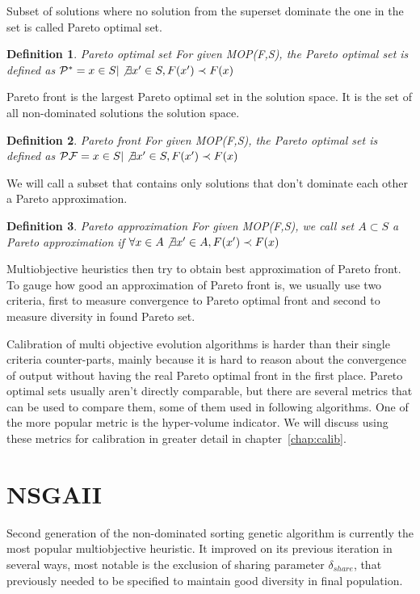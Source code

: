\documentclass[12pt,oneside]{fithesis2}
\newtheorem{defn}{Definition}
\begin{document}
Subset of solutions where no solution from the superset dominate the one in the set is called Pareto optimal set.

\begin{defn}{Pareto optimal set}
  For given MOP(F,S), the Pareto optimal set is defined as ${\cal{
P}^*} = {x \in S | \not \exists x' \in S, F(x') \prec F(x)}$
\end{defn}

Pareto front is the largest Pareto optimal set in the solution space. It is the set of all non-dominated solutions the solution space. 

\begin{defn}{Pareto front}
  For given MOP(F,S), the Pareto optimal set is defined as ${\cal
{PF}} = {x \in S | \not \exists x' \in S, F(x') \prec F(x)} $
\end{defn}

We will call a subset that contains only solutions that don't dominate each other a Pareto approximation.

\begin{defn}{Pareto approximation}
  For given MOP(F,S), we call set $A \subset S$ a  Pareto approximation if $\forall x \in A \not \exists x' \in A, F(x') \prec F(x)$
\end{defn}

Multiobjective heuristics then try to obtain best approximation of Pareto front. To gauge how good an approximation of Pareto front is, we usually use two criteria, first to measure convergence to Pareto optimal front and second to measure diversity in found Pareto set.

Calibration of multi objective evolution algorithms is harder than their single criteria counter-parts, mainly because it is hard to reason about the convergence of output without having the real Pareto optimal front in the first place. Pareto optimal sets usually aren't directly comparable, but there are several metrics that can be used to compare them, some of them used in following algorithms. One of the more popular metric is the hyper-volume indicator. We will discuss using these metrics for calibration in greater detail in chapter~\ref{chap:calib}.

\section{NSGAII}
Second generation of the non-dominated sorting genetic algorithm\cite{deb2002fast} is currently the most popular multiobjective heuristic. It improved on its previous iteration in several ways, most notable is the exclusion of sharing parameter $\delta_{share}$, that previously needed to be specified to maintain good diversity in final population.
\end{document}
